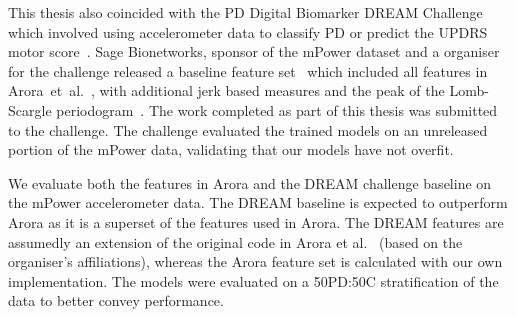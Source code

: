 \documentclass[12pt, twoside]{book}
\begin{document}
This thesis also coincided with the PD Digital Biomarker DREAM Challenge which involved using accelerometer data to classify PD or predict the UPDRS motor score~\cite{dreamchallengeinfo}. Sage Bionetworks, sponsor of the mPower dataset and a organiser for the challenge released a baseline feature set~\cite{mpowertools} which included all features in Arora~et~al.~\cite{arora2014high}, with additional jerk based measures and the peak of the Lomb-Scargle periodogram~\cite{lombscargle}. The work completed as part of this thesis was submitted to the challenge. The challenge evaluated the trained models on an unreleased portion of the mPower data, validating that our models have not overfit.


We evaluate both the features in Arora and the DREAM challenge baseline on the mPower accelerometer data. The DREAM baseline is expected to outperform Arora as it is a superset of the features used in Arora. The DREAM features are assumedly an extension of the original code in Arora et al.~\cite{arora2014high} (based on the organiser's affiliations), whereas the Arora feature set is calculated with our own implementation. The models were evaluated on a 50PD:50C stratification of the data to better convey performance.
\end{document}
